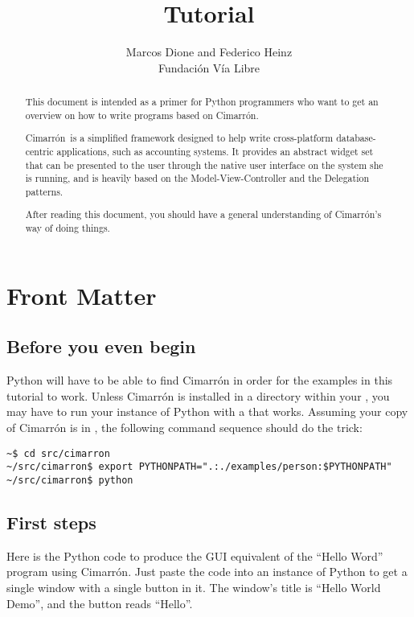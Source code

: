 \documentclass[a4paper]{howto}
\title{\Cimarron Tutorial}
\author{Marcos Dione and Federico Heinz\\Fundación Vía Libre}
\newcommand{\Cimarron}[0]{Cimarrón}
\begin{document}
\maketitle

\ifhtml
\chapter*{Front Matter}
\fi

\begin{abstract}
 \noindent
 This document is intended as a primer for Python programmers who want
 to get an overview on how to write programs based on \Cimarron.

 \Cimarron\ is a simplified framework designed to help write
 cross-platform database-centric applications, such as accounting
 systems. It provides an abstract widget set that can be presented to
 the user through the native user interface on the system she is
 running, and is heavily based on the Model-View-Controller and the
 Delegation patterns.

 After reading this document, you should have a general understanding of
 \Cimarron's way of doing things.
\end{abstract}

\tableofcontents

\section{Before you even begin}

Python will have to be able to find \Cimarron{} in order for the
examples in this tutorial to work. Unless \Cimarron{} is installed in
a directory within your , you may have to run your
instance of Python with a  that works. Assuming
your copy of \Cimarron{} is in ,
the following command sequence should do the trick:

\begin{verbatim}
~$ cd src/cimarron
~/src/cimarron$ export PYTHONPATH=".:./examples/person:$PYTHONPATH"
~/src/cimarron$ python
\end{verbatim}

\section{First steps}

Here is the Python code to produce the GUI equivalent of the ``Hello
Word'' program using \Cimarron. Just paste the code into an instance of
Python to get a single window with a single button in it. The window's
title is ``Hello World Demo'', and the button reads ``Hello''.
\end{document}
